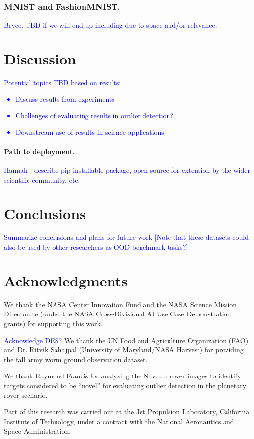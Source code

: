 \documentclass[letterpaper]{article} %
\newcommand{\todo}[1]{\textcolor{blue}{#1}}
\begin{document}

\subsubsection{MNIST and FashionMNIST.}
\todo{Bryce. TBD if we will end up including due to
space and/or relevance.}


\section{Discussion}
\todo{ 
Potential topics TBD based on results:
\begin{itemize}
\item Discuss results from experiments
\item Challenges of evaluating results in outlier detection?
\item Downstream use of results in science applications
\end{itemize}
}
\paragraph{Path to deployment.} \todo{Hannah - describe pip-installable
package, open-source for extension by the wider scientific community, etc.}

\section{Conclusions}
\todo{
Summarize conclusions and plans for future work
[Note that these datasets could also be used by other researchers as OOD
 benchmark tasks?]
}




\section{Acknowledgments}
We thank the NASA Center Innovation Fund and the NASA Science Mission 
Directorate (under the NASA Cross-Divisional AI Use Case Demonstration grants)
 for supporting this work.

\todo{Acknowledge DES?}
We thank the UN Food and Agriculture Organization (FAO) and Dr. Ritvik Sahajpal
(University of Maryland/NASA Harvest) for providing the fall army worm ground
 observation dataset.

We thank Raymond Francis for analyzing the Navcam rover images to
identify targets considered to be ``novel'' for evaluating outlier
detection in the planetary rover scenario.

Part of this research was carried out at the Jet Propulsion
Laboratory, California Institute of Technology, under a contract with
the National Aeronautics and Space Administration.
\end{document}
